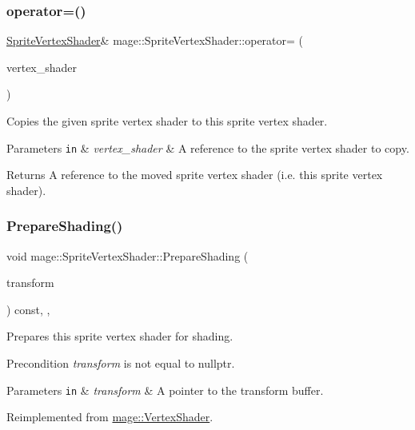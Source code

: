 \subsubsection{\texorpdfstring{operator=()}{operator=()}\hspace{0.1cm}{\footnotesize\ttfamily [2/2]}}
{\footnotesize\ttfamily \hyperlink{classmage_1_1_sprite_vertex_shader}{Sprite\+Vertex\+Shader}\& mage\+::\+Sprite\+Vertex\+Shader\+::operator= (\begin{DoxyParamCaption}\item[{\hyperlink{classmage_1_1_sprite_vertex_shader}{Sprite\+Vertex\+Shader} \&\&}]{vertex\+\_\+shader }\end{DoxyParamCaption})\hspace{0.3cm}{\ttfamily [delete]}}

Copies the given sprite vertex shader to this sprite vertex shader.


\begin{DoxyParams}[1]{Parameters}
\mbox{\tt in}  & {\em vertex\+\_\+shader} & A reference to the sprite vertex shader to copy. \\
\hline
\end{DoxyParams}
\begin{DoxyReturn}{Returns}
A reference to the moved sprite vertex shader (i.\+e. this sprite vertex shader). 
\end{DoxyReturn}
\hypertarget{classmage_1_1_sprite_vertex_shader_a10be47ca65f4baed735b5ffb52ee92bf}{}\label{classmage_1_1_sprite_vertex_shader_a10be47ca65f4baed735b5ffb52ee92bf} 
\subsubsection{\texorpdfstring{Prepare\+Shading()}{PrepareShading()}}
{\footnotesize\ttfamily void mage\+::\+Sprite\+Vertex\+Shader\+::\+Prepare\+Shading (\begin{DoxyParamCaption}\item[{I\+D3\+D11\+Buffer $\ast$}]{transform }\end{DoxyParamCaption}) const\hspace{0.3cm}{\ttfamily [final]}, {\ttfamily [override]}, {\ttfamily [virtual]}}

Prepares this sprite vertex shader for shading.

\begin{DoxyPrecond}{Precondition}
{\itshape transform} is not equal to {\ttfamily nullptr}. 
\end{DoxyPrecond}

\begin{DoxyParams}[1]{Parameters}
\mbox{\tt in}  & {\em transform} & A pointer to the transform buffer. \\
\hline
\end{DoxyParams}


Reimplemented from \hyperlink{classmage_1_1_vertex_shader_a53f4b25241f6c5739724d421c9f29a36}{mage\+::\+Vertex\+Shader}.

